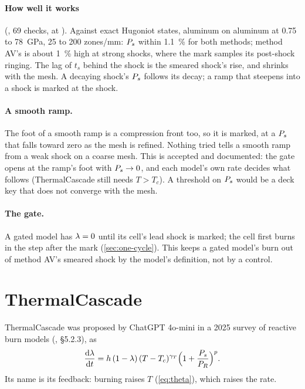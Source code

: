\paragraph{How well it works} (,
69 checks, at ). Against exact Hugoniot states, aluminum on
aluminum at 0.75 to 78~GPa, 25 to 200 zones/mm: $P_{s}$ within 1.1~\% for both
methods; method AV's is about 1~\% high at strong shocks, where the mark
samples its post-shock ringing. The lag of $t_s$ behind the shock is the
smeared shock's rise, and shrinks with the mesh. A decaying shock's $P_{s}$
follows its decay; a ramp that steepens into a shock is marked at the shock.

\paragraph{A smooth ramp.} The foot of a smooth ramp is a compression front
too, so it is marked, at a $P_{s}$ that falls toward zero as the mesh is
refined. Nothing tried tells a smooth ramp from a weak shock on a coarse
mesh. This is accepted and documented: the gate opens at the ramp's foot with
$P_{s} \to 0$, and each model's own rate decides what follows (ThermalCascade
still needs $T > T_c$). A threshold on $P_{s}$ would be a deck key that does
not converge with the mesh.

\paragraph{The gate.} A gated model has $\lambda = 0$ until its cell's lead
shock is marked; the cell first burns in the step after the mark
(\cref{sec:one-cycle}). This keeps a gated model's burn out of method AV's
smeared shock by the model's definition, not by a control.

\section{ThermalCascade}
\label{sec:thermalcascade}

ThermalCascade was proposed by ChatGPT 4o-mini in a 2025 survey of reactive
burn models (\cite{kittell2025sand}, \S 5.2.3), as
\begin{equation*}
  \frac{\mathrm{d}\lambda}{\mathrm{d} t} = h\,(1 - \lambda)\,(T - T_c)^{\gamma_T}
  \Bigl(1 + \frac{P_{s}}{P_R}\Bigr)^{p}.
\end{equation*}
Its name is its feedback: burning raises $T$ (\cref{eq:theta}), which raises
the rate.

